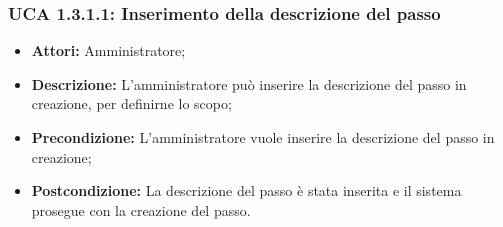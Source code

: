 \hypertarget{A1.3.1.1}{}
\subsubsection{UCA 1.3.1.1: Inserimento della descrizione del passo}
\begin{itemize}
\item \textbf{Attori:}
Amministratore;
\item \textbf{Descrizione:}
L'amministratore può inserire la descrizione del passo in creazione, per definirne lo scopo;
\item \textbf{Precondizione:}
L'amministratore vuole inserire la descrizione del passo in creazione;
\item \textbf{Postcondizione:}
La descrizione del passo è stata inserita e il sistema prosegue con la creazione del passo.
\end{itemize}

\hypertarget{A1.3.1.2}{}
